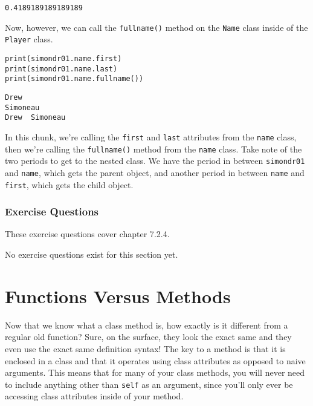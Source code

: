 \begin{lstlisting}[style=none]
0.4189189189189189
\end{lstlisting}
Now, however, we can call the \verb|fullname()| method on the \verb|Name| class inside of the \verb|Player| class.
\begin{lstlisting}[style=pippython]
print(simondr01.name.first)
print(simondr01.name.last)
print(simondr01.name.fullname())
\end{lstlisting}
\begin{lstlisting}[style=none]
Drew
Simoneau
Drew  Simoneau
\end{lstlisting}
In this chunk, we're calling the \verb|first| and \verb|last| attributes from the \verb|name| class, then we're calling the \verb|fullname()| method from the \verb|name| class. Take note of the two periods to get to the nested class. We have the period in between \verb|simondr01| and \verb|name|, which gets the parent object, and another period in between \verb|name| and \verb|first|, which gets the child object.
\subsubsection*{Exercise Questions}
These exercise questions cover chapter 7.2.4.

No exercise questions exist for this section yet.
\section{Functions Versus Methods}
Now that we know what a class method is, how exactly is it different from a regular old function? Sure, on the surface, they look the exact same and they even use the exact same definition syntax! The key to a method is that it is enclosed in a class and that it operates using class attributes as opposed to naive arguments. This means that for many of your class methods, you will never need to include anything other than \verb|self| as an argument, since you'll only ever be accessing class attributes inside of your method. 
